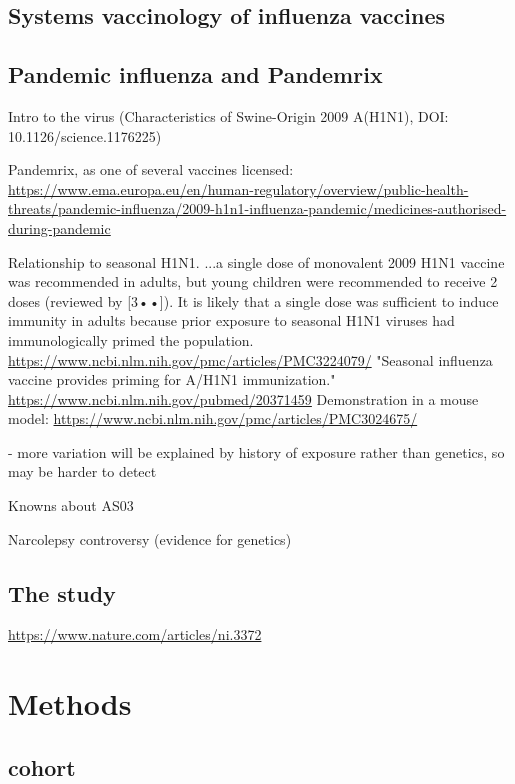 \subsection{Systems vaccinology of influenza vaccines}


\subsection{Pandemic influenza and Pandemrix}

Intro to the virus (Characteristics of Swine-Origin 2009 A(H1N1), DOI: 10.1126/science.1176225)

Pandemrix, as one of several vaccines licensed: \url{https://www.ema.europa.eu/en/human-regulatory/overview/public-health-threats/pandemic-influenza/2009-h1n1-influenza-pandemic/medicines-authorised-during-pandemic}

Relationship to seasonal H1N1.
...a single dose of monovalent 2009 H1N1 vaccine was recommended in adults, but
young children were recommended to receive 2 doses (reviewed by [3••]). It is
likely that a single dose was sufficient to induce immunity in adults because
prior exposure to seasonal H1N1 viruses had immunologically primed the
population. \url{https://www.ncbi.nlm.nih.gov/pmc/articles/PMC3224079/}
"Seasonal influenza vaccine provides priming for A/H1N1 immunization." \url{https://www.ncbi.nlm.nih.gov/pubmed/20371459}
Demonstration in a mouse model: \url{https://www.ncbi.nlm.nih.gov/pmc/articles/PMC3024675/}

- more variation will be explained by history of exposure rather than genetics, so may be harder to detect

Knowns about AS03

Narcolepsy controversy (evidence for genetics)

\subsection{The  study}

\url{https://www.nature.com/articles/ni.3372}

\section{Methods}

\subsection{ cohort}

